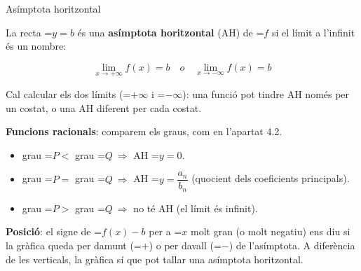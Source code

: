 \documentclass[11pt,a4paper]{article}
\newcommand{\lt}{<}\newcommand{\gt}{>}
\newcommand{\fmm}[1]{\setbox0=\hbox{$#1$}\ifdim\wd0>\linewidth\[#1\]\else\mbox{\box0}\fi}
\newcommand{\fmuline}[1]{\textbf{\color{fmaccent}#1}}
\begin{document}
  
\begin{fmdef}{Asímptota horitzontal}
\par\noindent \begin{minipage}[t]{0.48\linewidth}\vspace{0pt}\raggedright La recta \fmm{y=b} és una \textbf{asímptota horitzontal} (AH) de \fmm{f} si el límit a l'infinit és un nombre:

          
\[\lim_{x\to+\infty}f(x)=b\quad o\quad\lim_{x\to-\infty}f(x)=b\]

          

Cal calcular els dos límits (\fmm{+\infty} i \fmm{-\infty}): una funció pot tindre AH només per un costat, o una AH diferent per cada costat.\end{minipage}\hfill\begin{minipage}[t]{0.48\linewidth}\vspace{0pt}\raggedright \begin{center}\end{center}\end{minipage}\par\medskip

      

\fmuline{Funcions racionals}: comparem els graus, com en l'apartat 4.2.

      
\begin{itemize}
\item grau \fmm{P\lt} grau \fmm{Q\ \Rightarrow} AH \fmm{y=0}.
\item grau \fmm{P=} grau \fmm{Q\ \Rightarrow} AH \fmm{y=\dfrac{a_n}{b_n}} (quocient dels coeficients principals).
\item grau \fmm{P\gt} grau \fmm{Q\ \Rightarrow} no té AH (el límit és infinit).
\end{itemize}

      
\begin{fmnote}\fmuline{Posició}: el signe de \fmm{f(x)-b} per a \fmm{x} molt gran (o molt negatiu) ens diu si la gràfica queda per damunt (\fmm{+}) o per davall (\fmm{-}) de l'asímptota. A diferència de les verticals, la gràfica sí que pot tallar una asímptota horitzontal.\end{fmnote}
\end{fmdef}
\end{document}
